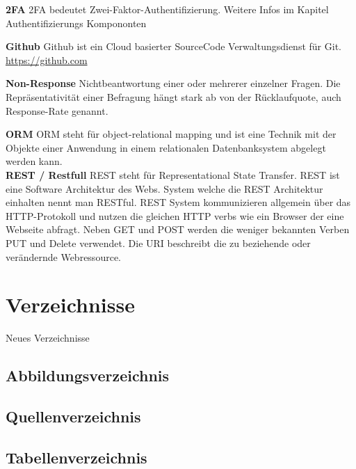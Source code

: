 \textbf{2FA} 2FA bedeutet Zwei-Faktor-Authentifizierung. Weitere Infos
im Kapitel Authentifizierungs Kompononten

\textbf{Github} Github ist ein Cloud basierter SourceCode
Verwaltungsdienst für Git. \url{https://github.com}

\textbf{Non-Response} Nichtbeantwortung einer oder mehrerer einzelner
Fragen. Die Repräsentativität einer Befragung hängt stark ab von der
Rücklaufquote, auch Response-Rate genannt.

\textbf{ORM} ORM steht für object-relational mapping und ist eine
Technik mit der Objekte einer Anwendung in einem relationalen
Datenbanksystem abgelegt werden kann.\\

\textbf{REST / Restfull} REST steht für Representational State Transfer.
REST ist eine Software Architektur des Webs. System welche die REST
Architektur einhalten nennt man RESTful. REST System kommunizieren
allgemein über das HTTP-Protokoll und nutzen die gleichen HTTP verbs wie
ein Browser der eine Webseite abfragt. Neben GET und POST werden die
weniger bekannten Verben PUT und Delete verwendet. Die URI beschreibt
die zu beziehende oder verändernde Webressource.

\chapter{Verzeichnisse}\label{verzeichnisse}

Neues Verzeichnisse

\section{Abbildungsverzeichnis}\label{abbildungsverzeichnis}

\renewcommand{\listfigurename}{} 

\begingroup\let\clearpage\relax
\listoffigures
\endgroup

\pagebreak

\section{Quellenverzeichnis}\label{quellenverzeichnis}

\renewcommand{\bibname}{}

\begingroup \let\clearpage\relax
\printbibliography
\endgroup

\pagebreak

\section{Tabellenverzeichnis}\label{tabellenverzeichnis}

\renewcommand{\listtablename}{} 

\begingroup \let\clearpage\relax
\listoftables
\endgroup





